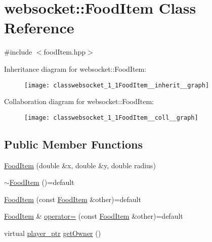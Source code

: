 \hypertarget{classwebsocket_1_1FoodItem}{}\section{websocket\+:\+:Food\+Item Class Reference}
\label{classwebsocket_1_1FoodItem}


{\ttfamily \#include $<$food\+Item.\+hpp$>$}



Inheritance diagram for websocket\+:\+:Food\+Item\+:
\nopagebreak
\begin{figure}[H]
\begin{center}
\leavevmode
\texttt{[image: classwebsocket\_1\_1FoodItem\_\_inherit\_\_graph]}
\end{center}
\end{figure}


Collaboration diagram for websocket\+:\+:Food\+Item\+:
\nopagebreak
\begin{figure}[H]
\begin{center}
\leavevmode
\texttt{[image: classwebsocket\_1\_1FoodItem\_\_coll\_\_graph]}
\end{center}
\end{figure}
\subsection*{Public Member Functions}
\begin{DoxyCompactItemize}
\item 
\hyperlink{classwebsocket_1_1FoodItem_a2e34bb4440281bf3f8c01c1952c58d39}{Food\+Item} (double \&x, double \&y, double radius)
\item 
\hyperlink{classwebsocket_1_1FoodItem_a870abf88e3f80d5218fa017e52601d60}{$\sim$\+Food\+Item} ()=default
\item 
\hyperlink{classwebsocket_1_1FoodItem_ac69bbf80ef72ce4bdb8dd73be2066d10}{Food\+Item} (const \hyperlink{classwebsocket_1_1FoodItem}{Food\+Item} \&other)=default
\item 
\hyperlink{classwebsocket_1_1FoodItem}{Food\+Item} \& \hyperlink{classwebsocket_1_1FoodItem_ac3726c11be41df9a1dbbab983d35bd43}{operator=} (const \hyperlink{classwebsocket_1_1FoodItem}{Food\+Item} \&other)=default
\item 
virtual \hyperlink{namespacewebsocket_aec8d52893bdf524a1412533a63b006a3}{player\+\_\+ptr} \hyperlink{classwebsocket_1_1FoodItem_a4c39197cbbe8563fe94c4fd886a897e0}{get\+Owner} ()
\end{DoxyCompactItemize}
